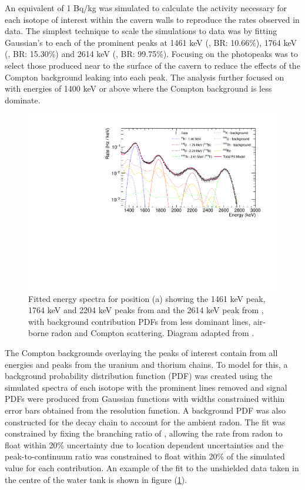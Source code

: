 An equivalent of 1 Bq/kg was simulated to calculate the activity necessary for each isotope of interest within the cavern walls to reproduce the rates observed in data. The simplest technique to scale the simulations to data was by fitting Gaussian's to each of the prominent peaks at 1461 keV (\KFZ{}, BR: 10.66\%), 1764 keV (\BiTOF{}, BR: 15.30\%) and 2614 keV (\TlTZE{}, BR: 99.75\%). Focusing on the photopeaks was to select those \grays{} produced near to the surface of the cavern to reduce the effects of the Compton background leaking into each peak. The analysis further focused on \grays{} with energies of 1400 keV or above where the Compton background is less dominate. 
%
\begin{figure}[t!]
    \centering
    \includegraphics[scale=0.80]{Chapter_3/Figures/Cavern_peak_fits.pdf}
    \caption[Fitted energy spectra for position (a) showing the 1461 keV \KFZ{} peak, 1764 keV and 2204 keV peaks from \UTTE{} and the 2614 keV peak from \ThTTT{}, with background contributions.]
    {Fitted energy spectra for position (a) showing the 1461 keV \KFZ{} peak, 1764 keV and 2204 keV peaks from \UTTE{} and the 2614 keV peak from \ThTTT{}, with background contribution PDFs from less dominant lines, air-borne radon and Compton scattering. Diagram adapted from \cite{Akerib_2020_gray_measurements}.}
    \label{fig:davis_cavern_spectra_fit}
\end{figure}
%
The Compton backgrounds overlaying the peaks of interest contain \grays{} from all energies and peaks from the uranium and thorium chains. To model for this, a background probability distribution function (PDF) was created using the simulated spectra of each isotope with the prominent lines removed and signal PDFs were produced from Gaussian functions with widths constrained within error bars obtained from the resolution function. A background PDF was also constructed for the \RnTTT{} decay chain \grays{} to account for the ambient radon. The fit was constrained by fixing the branching ratio of \BiTOF{}, allowing the rate from radon to  float within 20\% uncertainty due to location dependent uncertainties and the peak-to-continuum ratio was constrained to float within 20\% of the simulated value for each contribution. An example of the fit to the unshielded data taken in the centre of the water tank is shown in figure (\ref{fig:davis_cavern_spectra_fit}).

